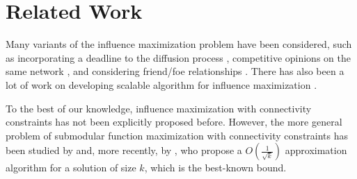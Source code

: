 \section{Related Work}
Many variants of the influence maximization problem have been considered, such as incorporating a deadline to the diffusion process \cite{chen2012time}, competitive opinions on the same network \cite{bharathi07competitive}, and considering friend/foe relationships \cite{li2013influence}. There has also been a lot of work on developing scalable algorithm for influence maximization \cite{borgs:soda14}.

To the best of our knowledge, influence maximization with connectivity constraints has not been explicitly proposed before. However, the more general problem of submodular function maximization with connectivity constraints has been studied by \cite{krause2006near} and, more recently, by \cite{kuo2015maximizing}, who propose a $O(\frac{1}{\sqrt{k}})$ approximation algorithm for a solution of size $k$, which is the best-known bound.
